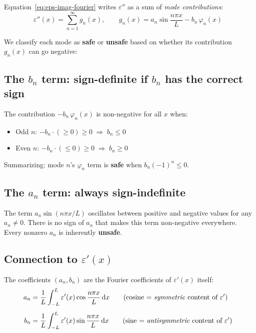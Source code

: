 \documentclass[11pt]{article}
\newcommand{\eps}{\varepsilon}
\newcommand{\dd}{\mathrm{d}}
\begin{document}
Equation~\eqref{eq:eps-imag-fourier} writes $\eps''$ as a sum of \emph{mode contributions}:
\begin{equation}
\eps''(x) = \sum_{n=1}^{\infty} g_n(x), \qquad g_n(x) = a_n\sin\frac{n\pi x}{L} - b_n\,\varphi_n(x)
\end{equation}

We classify each mode as \textbf{safe} or \textbf{unsafe} based on whether its contribution $g_n(x)$ can go negative:

\subsection{The $b_n$ term: sign-definite if $b_n$ has the correct sign}

The contribution $-b_n\,\varphi_n(x)$ is non-negative for all $x$ when:
\begin{itemize}
\item Odd $n$: $-b_n \cdot (\geq 0) \geq 0 \;\Longrightarrow\; b_n \leq 0$
\item Even $n$: $-b_n \cdot (\leq 0) \geq 0 \;\Longrightarrow\; b_n \geq 0$
\end{itemize}

Summarizing: mode $n$'s $\varphi_n$ term is \textbf{safe} when $b_n (-1)^n \leq 0$.

\subsection{The $a_n$ term: always sign-indefinite}

The term $a_n \sin(n\pi x/L)$ oscillates between positive and negative values for any $a_n \neq 0$.  There is no sign of $a_n$ that makes this term non-negative everywhere.  Every nonzero $a_n$ is inherently \textbf{unsafe}.

\subsection{Connection to $\eps'(x)$}

The coefficients $(a_n, b_n)$ are the Fourier coefficients of $\eps'(x)$ itself:
\begin{align}
a_n &= \frac{1}{L}\int_{-L}^{L} \eps'(x)\cos\frac{n\pi x}{L}\,\dd x \qquad\text{(cosine = \emph{symmetric} content of $\eps'$)} \\[4pt]
b_n &= \frac{1}{L}\int_{-L}^{L} \eps'(x)\sin\frac{n\pi x}{L}\,\dd x \qquad\text{(sine = \emph{antisymmetric} content of $\eps'$)}
\end{align}
\end{document}

